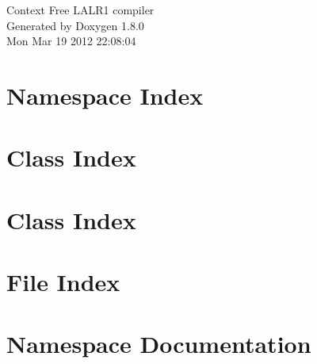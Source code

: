 \documentclass{book}
\begin{document}
\hypersetup{pageanchor=false,citecolor=blue}
\begin{titlepage}
\vspace*{7cm}
\begin{center}
{\Large Context Free L\-A\-L\-R1 compiler }\\
\vspace*{1cm}
{\large Generated by Doxygen 1.8.0}\\
\vspace*{0.5cm}
{\small Mon Mar 19 2012 22:08:04}\\
\end{center}
\end{titlepage}
\clearemptydoublepage
{}
\tableofcontents
\clearemptydoublepage
{}
\hypersetup{pageanchor=true,citecolor=blue}
\chapter{Namespace Index}

\chapter{Class Index}

\chapter{Class Index}

\chapter{File Index}

\chapter{Namespace Documentation}






\end{document}
